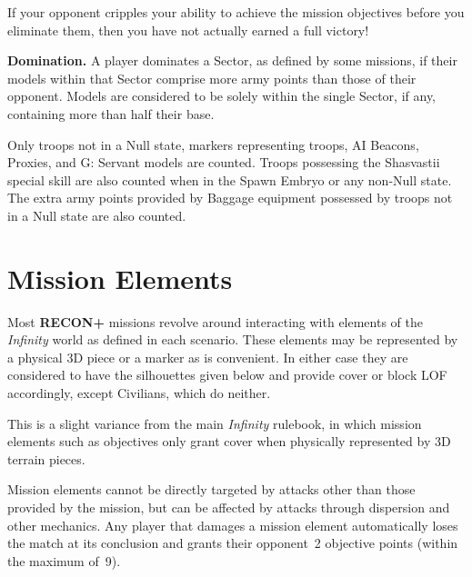 \documentclass[14pt,dvipsnames]{extarticle}
\newcommand{\missionrule}[1]{\noindent\textbf{#1}\xspace}
\newcommand{\reconplus}{\textbf{RECON+}\xspace}
\begin{document}
\begin{recon}
  If your opponent cripples your ability to achieve the mission
  objectives before you eliminate them, then you have not actually
  earned a full victory!
\end{recon}

\missionrule{Domination.}  A player dominates a Sector, as defined by
some missions, if their models within that Sector comprise more army
points than those of their opponent.  Models are considered to be
solely within the single Sector, if any, containing more than half
their base.

Only troops not in a Null state, markers representing troops, AI
Beacons, Proxies, and G: Servant models are counted.  Troops
possessing the Shasvastii special skill are also counted when in the
Spawn Embryo or any non-Null state.  The extra army points provided by
Baggage equipment possessed by troops not in a Null state are also
counted.

\section{Mission Elements}

Most \reconplus missions revolve around interacting with elements of
the \emph{Infinity} world as defined in each scenario.  These elements
may be represented by a physical 3D piece or a marker as is
convenient.  In either case they are considered to have the
silhouettes given below and provide cover or block LOF accordingly,
except Civilians, which do neither.

\begin{recon}
  This is a slight variance from the main \emph{Infinity} rulebook, in
  which mission elements such as objectives only grant cover when
  physically represented by 3D terrain pieces.
\end{recon}

Mission elements cannot be directly targeted by attacks other than
those provided by the mission, but can be affected by attacks through
dispersion and other mechanics.  Any player that damages a mission
element automatically loses the match at its conclusion and grants
their opponent~2 objective points (within the maximum of~9).
\end{document}
